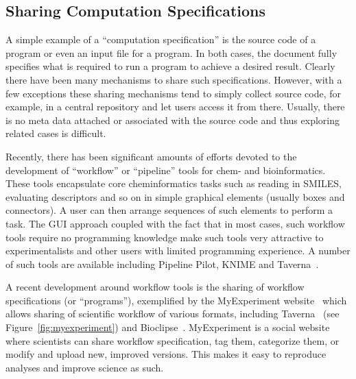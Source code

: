 \documentclass[11pt]{book}
\begin{document}
\subsection{Sharing Computation Specifications}

A simple example of a ``computation specification'' is the source code
of a program or even an input file for a program. In both cases, the
document fully specifies what is required to run a program to achieve
a desired result. Clearly there have been many mechanisms to share
such specifications. However, with a few exceptions these sharing
mechanisms tend to simply collect source code, for example, in a
central repository and let users access it from there. Usually, there
is no meta data attached or associated with the source code and thus
exploring related cases is difficult.

Recently, there has been significant amounts of efforts devoted to the
development of ``workflow'' or ``pipeline'' tools for chem- and
bioinformatics. These tools encapsulate core cheminformatics tasks
such as reading in SMILES, evaluating descriptors and so on in simple
graphical elements (usually boxes and connectors). A user can then
arrange sequences of such elements to perform a task. The GUI approach
coupled with the fact that in most cases, such workflow tools require
no programming knowledge make such tools very attractive to
experimentalists and other users with limited programming
experience. A number of such tools are available including Pipeline
Pilot, KNIME and Taverna~\cite{Oinn2004}.

A recent development around workflow tools is the sharing of workflow
specifications (or ``programs''), exemplified by the MyExperiment
website~\cite{Goble2010} which allows sharing of scientific workflow
of various formats, including Taverna~\cite{Oinn2004,Kuhn2010}
(see Figure~\ref{fig:myexperiment})
and Bioclipse~\cite{Spjuth2009,Spjuth2007}.
MyExperiment is a social website where scientists can share
workflow specification, tag them, categorize them, or modify and
upload new, improved versions. This makes it easy to
reproduce analyses and improve science as such.
\end{document}
